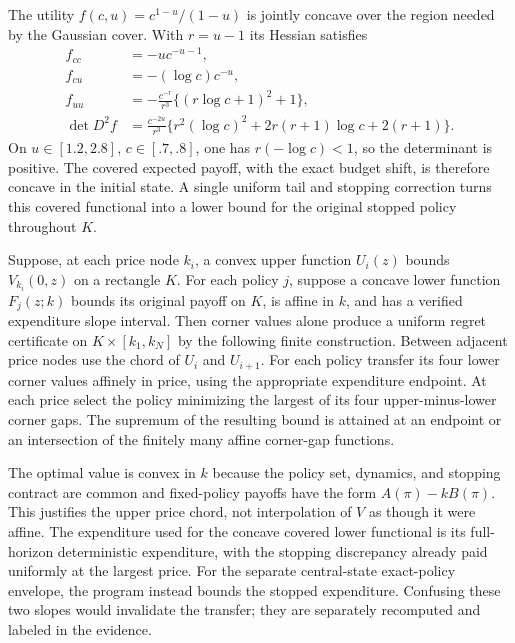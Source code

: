 The utility $f(c,u)=c^{1-u}/(1-u)$ is jointly concave over the region needed by the Gaussian cover. With $r=u-1$ its Hessian satisfies
\begin{align*}
 f_{cc}&=-u c^{-u-1},\\
 f_{cu}&=-(\log c)c^{-u},\\
 f_{uu}&=-\frac{c^{-r}}{r^3}\{(r\log c+1)^2+1\},\\
 \det D^2f&=\frac{c^{-2u}}{r^3}
 \{r^2(\log c)^2+2r(r+1)\log c+2(r+1)\}.
\end{align*}
On $u\in[1.2,2.8]$, $c\in[.7,.8]$, one has $r(-\log c)<1$, so the determinant is positive. The covered expected payoff, with the exact budget shift, is therefore concave in the initial state. A single uniform tail and stopping correction turns this covered functional into a lower bound for the original stopped policy throughout $K$.

\begin{proposition}\label{prop:stateprice}
Suppose, at each price node $k_i$, a convex upper function $U_i(z)$ bounds $V_{k_i}(0,z)$ on a rectangle $K$. For each policy $j$, suppose a concave lower function $F_j(z;k)$ bounds its original payoff on $K$, is affine in $k$, and has a verified expenditure slope interval. Then corner values alone produce a uniform regret certificate on $K\times[k_1,k_N]$ by the following finite construction. Between adjacent price nodes use the chord of $U_i$ and $U_{i+1}$. For each policy transfer its four lower corner values affinely in price, using the appropriate expenditure endpoint. At each price select the policy minimizing the largest of its four upper-minus-lower corner gaps. The supremum of the resulting bound is attained at an endpoint or an intersection of the finitely many affine corner-gap functions.
\end{proposition}

The optimal value is convex in $k$ because the policy set, dynamics, and stopping contract are common and fixed-policy payoffs have the form $A(\pi)-kB(\pi)$. This justifies the upper price chord, not interpolation of $V$ as though it were affine. The expenditure used for the concave covered lower functional is its full-horizon deterministic expenditure, with the stopping discrepancy already paid uniformly at the largest price. For the separate central-state exact-policy envelope, the program instead bounds the stopped expenditure. Confusing these two slopes would invalidate the transfer; they are separately recomputed and labeled in the evidence.

